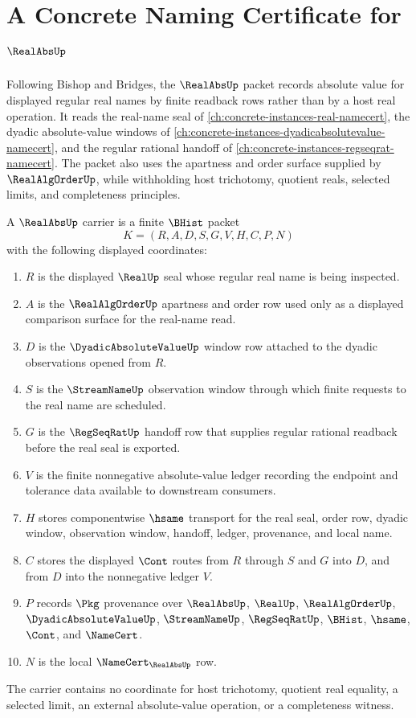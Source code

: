 \chapter{A Concrete Naming Certificate for $\RealAbsUp$}
\label{ch:concrete-instances-real-abs-namecert}

Following Bishop and Bridges, the $\RealAbsUp$ packet records absolute value for displayed regular real names by finite readback rows rather than by a host real operation. It reads the real-name seal of \autoref{ch:concrete-instances-real-namecert}, the dyadic absolute-value windows of \autoref{ch:concrete-instances-dyadicabsolutevalue-namecert}, and the regular rational handoff of \autoref{ch:concrete-instances-regseqrat-namecert}. The packet also uses the apartness and order surface supplied by $\RealAlgOrderUp$, while withholding host trichotomy, quotient reals, selected limits, and completeness principles.

\begin{definition}
\label{def:real-abs-carrier}
A $\RealAbsUp$ carrier is a finite $\BHist$ packet
$$
K=(R,A,D,S,G,V,H,C,P,N)
$$
with the following displayed coordinates:
\begin{enumerate}
\item $R$ is the displayed $\RealUp$ seal whose regular real name is being inspected.
\item $A$ is the $\RealAlgOrderUp$ apartness and order row used only as a displayed comparison surface for the real-name read.
\item $D$ is the $\DyadicAbsoluteValueUp$ window row attached to the dyadic observations opened from $R$.
\item $S$ is the $\StreamNameUp$ observation window through which finite requests to the real name are scheduled.
\item $G$ is the $\RegSeqRatUp$ handoff row that supplies regular rational readback before the real seal is exported.
\item $V$ is the finite nonnegative absolute-value ledger recording the endpoint and tolerance data available to downstream consumers.
\item $H$ stores componentwise $\hsame$ transport for the real seal, order row, dyadic window, observation window, handoff, ledger, provenance, and local name.
\item $C$ stores the displayed $\Cont$ routes from $R$ through $S$ and $G$ into $D$, and from $D$ into the nonnegative ledger $V$.
\item $P$ records $\Pkg$ provenance over $\RealAbsUp$, $\RealUp$, $\RealAlgOrderUp$, $\DyadicAbsoluteValueUp$, $\StreamNameUp$, $\RegSeqRatUp$, $\BHist$, $\hsame$, $\Cont$, and $\NameCert$.
\item $N$ is the local $\NameCert_{\RealAbsUp}$ row.
\end{enumerate}
The carrier contains no coordinate for host trichotomy, quotient real equality, a selected limit, an external absolute-value operation, or a completeness witness.
\end{definition}


